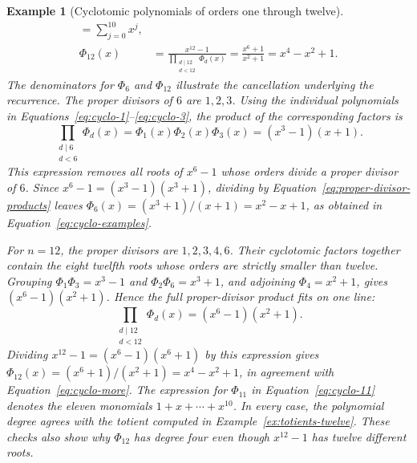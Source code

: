 \documentclass[11pt,a4paper]{article}
\numberwithin{equation}{section}
\theoremstyle{uprightpaper}
\newtheorem{example}{Example}[section]
\begin{document}
\begin{example}[Cyclotomic polynomials of orders one through twelve]
\begin{align}
 =\sum_{j=0}^{10}x^j,\label{eq:cyclo-11}\\
 \Phi_{12}(x)&=
 \frac{x^{12}-1}{\displaystyle\prod_{\substack{d\mid12\\d<12}}\Phi_d(x)}
 =\frac{x^6+1}{x^2+1}=x^4-x^2+1.\label{eq:cyclo-more}
\end{align}
The denominators for $\Phi_6$ and $\Phi_{12}$ illustrate the
cancellation underlying the recurrence. The proper divisors of $6$
are $1,2,3$. Using the individual polynomials in
Equations~\eqref{eq:cyclo-1}--\eqref{eq:cyclo-3}, the product of the
corresponding factors is
\begin{equation}\label{eq:proper-divisor-products}
 \prod_{\substack{d\mid6\\d<6}}\Phi_d(x)
 =\Phi_1(x)\Phi_2(x)\Phi_3(x)=(x^3-1)(x+1).
\end{equation}
This expression removes all roots of $x^6-1$ whose orders divide a
proper divisor of $6$. Since $x^6-1=(x^3-1)(x^3+1)$, dividing by
Equation~\eqref{eq:proper-divisor-products} leaves
$\Phi_6(x)=(x^3+1)/(x+1)=x^2-x+1$, as obtained in
Equation~\eqref{eq:cyclo-examples}.

For $n=12$, the proper divisors are $1,2,3,4,6$. Their cyclotomic
factors together contain the eight twelfth roots whose orders are
strictly smaller than twelve. Grouping $\Phi_1\Phi_3=x^3-1$ and
$\Phi_2\Phi_6=x^3+1$, and adjoining $\Phi_4=x^2+1$, gives
$(x^6-1)(x^2+1)$. Hence the full proper-divisor product fits on one line:
\begin{equation}\label{eq:proper-divisor-products-twelve}
 \prod_{\substack{d\mid12\\d<12}}\Phi_d(x)
 =(x^6-1)(x^2+1).
\end{equation}
Dividing $x^{12}-1=(x^6-1)(x^6+1)$ by this expression gives
$\Phi_{12}(x)=(x^6+1)/(x^2+1)=x^4-x^2+1$, in agreement with
Equation~\eqref{eq:cyclo-more}. The expression for $\Phi_{11}$ in
Equation~\eqref{eq:cyclo-11} denotes the eleven monomials
$1+x+\cdots+x^{10}$. In every case, the polynomial degree agrees
with the totient computed in Example~\ref{ex:totients-twelve}.
These checks also show why $\Phi_{12}$ has degree four even though
$x^{12}-1$ has twelve different roots.
\end{example}
\end{document}
